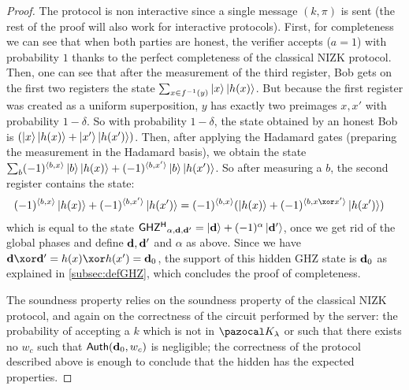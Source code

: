 \begin{proof}
  The protocol is non interactive since a single message $(k,\pi)$ is sent (the rest of the proof will also work for interactive protocols). First, for completeness we can see that when both parties are honest, the verifier accepts ($a=1$) with probability $1$ thanks to the perfect completeness of the classical NIZK protocol. Then, one can see that after the measurement of the third register, Bob gets on the first two registers the state $\sum_{x \in f^{-1}(y)} \ket{x}\ket{h(x)}$. But because the first register was created as a uniform superposition, $y$ has exactly two preimages $x,x'$ with probability $1-\delta$. So with probability $1-\delta$, the state obtained by an honest Bob is $(\ket{x}\ket{h(x)}+\ket{x'}\ket{h(x')})$. Then, after applying the Hadamard gates (preparing the measurement in the Hadamard basis), we obtain the state $\sum_b (-1)^{\langle b, x\rangle}\ket{b}\ket{h(x)} + (-1)^{\langle b, x'\rangle}\ket{b}\ket{h(x')}$. So after measuring a $b$, the second register contains the state:
  \begin{align}
    (-1)^{\langle b, x\rangle}\ket{h(x)}+(-1)^{\langle b, x'\rangle}\ket{h(x')} &= (-1)^{\langle b, x\rangle}(\ket{h(x)}+(-1)^{\langle b, x \xor x'\rangle}\ket{h(x')})
  \end{align}
  which is equal to the state $ {\sf GHZ^H} {}_{\alpha,\mathbf{d},\mathbf{d}'} = \ket{\mathbf{d}} + (-1)^\alpha\ket{\mathbf{d}'}$, once we get rid of the global phases and define $\mathbf{d}, \mathbf{d}'$ and $\alpha$ as above. Since we have $\vect{d} \xor \vect{d}' = h(x) \xor h(x') = \vect{d}_0$, the support of this hidden GHZ state is $\mathbf{d}_0$ as explained in \cref{subsec:defGHZ}, which concludes the proof of completeness.

  The soundness property relies on the soundness property of the classical NIZK protocol, and again on the correctness of the circuit performed by the server: the probability of accepting a $k$ which is not in $\cK_\lambda$ or such that there exists no $w_c$ such that ${\sf Auth}(\mathbf{d}_0, w_c)$ is negligible; the correctness of the protocol described above is enough to conclude that the hidden \GHZ{} has the expected properties.


\end{proof}
